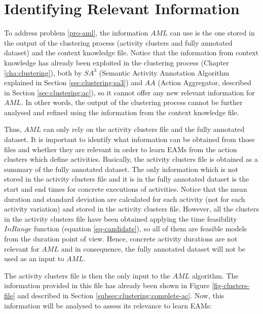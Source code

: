 \section{Identifying Relevant Information}
\label{sec:learner:relevant}


To address problem \ref{pro-aml}, the information $AML$ can use is the one stored in the output of the clustering process (activity clusters and fully annotated dataset) and the context knowledge file. Notice that the information from context knowledge has already been exploited in the clustering process (Chapter \ref{cha:clustering}), both by $SA^3$ (Semantic Activity Annotation Algorithm explained in Section \ref{sec:clustering:sa3}) and $AA$ (Action Aggregator, described in Section \ref{sec:clustering:ac}), so it cannot offer any new relevant information for $AML$. In other words, the output of the clustering process cannot be further analysed and refined using the information from the context knowledge file.

Thus, $AML$ can only rely on the activity clusters file and the fully annotated dataset. It is important to identify what information can be obtained from those files and whether they are relevant in order to learn EAMs from the action clusters which define activities. Basically, the activity clusters file is obtained as a summary of the fully annotated dataset. The only information which is not stored in the activity clusters file and it is in the fully annotated dataset is the start and end times for concrete executions of activities. Notice that the mean duration and standard deviation are calculated for each activity (not for each activity variation) and stored in the activity clusters file. However, all the clusters in the activity clusters file have been obtained applying the time feasibility $InRange$ function (equation \ref{eq-candidate}), so all of them are feasible models from the duration point of view. Hence, concrete activity durations are not relevant for $AML$ and in consequence, the fully annotated dataset will not be used as an input to $AML$.

The activity clusters file is then the only input to the $AML$ algorithm. The information provided in this file has already been shown in Figure \ref{fig-clusters-file} and described in Section \ref{subsec:clustering:complete-ac}. Now, this information will be analysed to assess its relevance to learn EAMs:

